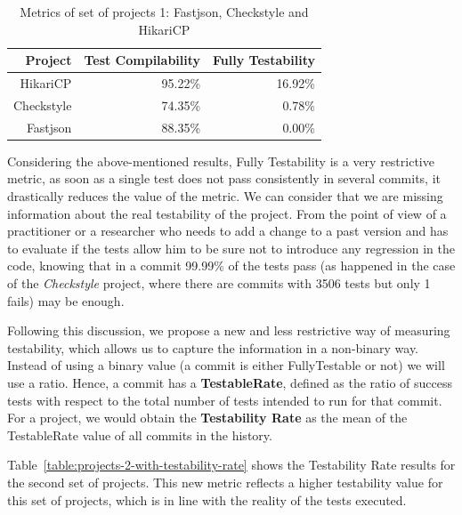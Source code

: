 \begin{figure}[!htb]
\begin{minipage}{.5\linewidth}
        \label{fig:hikari}
    \end{minipage}%
\end{figure}

\begin{table}[h!]
    \centering
    \begin{tabular}{|r|r|r|}
    \hline
    \textbf{Project} & \textbf{Test Compilability} & \textbf{Fully Testability} \\ \hline
    HikariCP         & 95.22\%                      & 16.92\%                      \\ \hline
    Checkstyle       & 74.35\%                      & 0.78\%                      \\ \hline
    Fastjson         & 88.35\%                      & 0.00\%                      \\ \hline
    \end{tabular}
    \caption{Metrics of set of projects 1: Fastjson, Checkstyle and HikariCP}
    \label{table:projects-2}
\end{table}

Considering the above-mentioned results, Fully Testability is a very restrictive metric, as soon as a single test does not pass consistently in several commits, it drastically reduces the value of the metric. 
We can consider that we are missing information about the real testability of the project.
From the point of view of a practitioner or a researcher who needs to add a change to a past version and has to evaluate if the tests allow him to be sure not to introduce any regression in the code, knowing that in a commit 99.99\% of the tests pass (as happened in the case of the \textit{Checkstyle} project, where there are commits with 3506 tests but only 1 fails) may be enough.

Following this discussion, we propose a new and less restrictive way of measuring testability, which allows us to capture the information in a non-binary way. 
Instead of using a binary value (a commit is either FullyTestable or not) we will use a ratio. 
Hence, a commit has a \textbf{TestableRate}, defined as the ratio of success tests with respect to the total number of tests intended to run for that commit.
For a project, we would obtain the \textbf{Testability Rate} as the mean of the TestableRate value of all commits in the history.

Table~\ref{table:projects-2-with-testability-rate} shows the Testability Rate results for the second set of projects.
This new metric reflects a higher testability value for this set of projects, which is in line with the reality of the tests executed.

